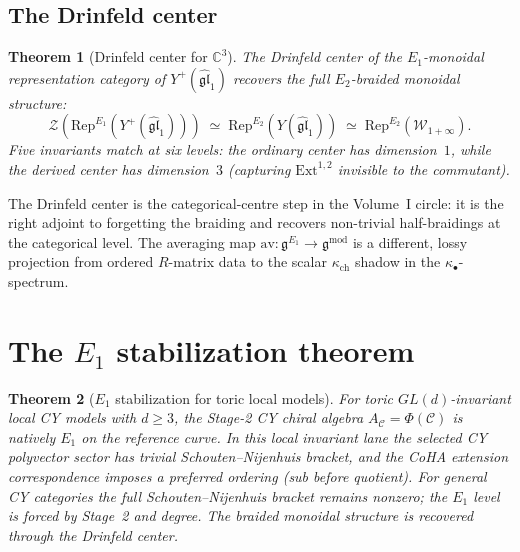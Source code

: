 \documentclass[11pt]{article}
\theoremstyle{plain}
\newtheorem{theorem}{Theorem}[section]
\theoremstyle{definition}
\theoremstyle{remark}
\newcommand{\fg}{\mathfrak{g}}
\newcommand{\fgl}{\mathfrak{gl}}
\newcommand{\cC}{\mathcal{C}}
\newcommand{\cW}{\mathcal{W}}
\newcommand{\cZ}{\mathcal{Z}}
\newcommand{\bC}{\mathbb{C}}
\newcommand{\Eone}{E_1}
\newcommand{\Etwo}{E_2}
\newcommand{\Rep}{\mathrm{Rep}}
\newcommand{\Ext}{\mathrm{Ext}}
\begin{document}
\subsection{The Drinfeld center}

\begin{theorem}[Drinfeld center for $\bC^3$]
\label{thm:v3-st-drinfeld-center}
The Drinfeld center of the $\Eone$-monoidal representation
category of $Y^+(\widehat{\fgl}_1)$ recovers the full
$\Etwo$-braided monoidal structure:
\[
 \cZ(\Rep^{\Eone}(Y^+(\widehat{\fgl}_1)))
 \;\simeq\;
 \Rep^{\Etwo}(Y(\widehat{\fgl}_1))
 \;\simeq\;
 \Rep^{\Etwo}(\cW_{1+\infty}).
\]
Five invariants match at six levels: the ordinary center has
dimension~$1$, while the derived center has dimension~$3$
(capturing $\Ext^{1,2}$ invisible to the commutant).
\end{theorem}

The Drinfeld center is the categorical-centre step in the Volume~I
circle: it is the right adjoint to forgetting the braiding and
recovers non-trivial half-braidings at the categorical level. The
averaging map
$\mathrm{av} \colon \fg^{\Eone} \to \fg^{\mathrm{mod}}$
is a different, lossy projection from ordered $R$-matrix data to the
scalar $\kappa_{\mathrm{ch}}$ shadow in the $\kappa_\bullet$-spectrum.



\section{The $\Eone$ stabilization theorem}
\label{sec:e1-stabilization}

\begin{theorem}[$\Eone$ stabilization for toric local models]
\label{thm:v3-st-e1-stabilization}
For toric $GL(d)$-invariant local CY models with $d \geq 3$, the
Stage-2 CY chiral algebra $A_\cC=\Phi(\cC)$ is natively $\Eone$ on
the reference curve.  In this local invariant lane the selected CY
polyvector sector has trivial Schouten--Nijenhuis bracket, and the
CoHA extension correspondence imposes a preferred ordering (sub
before quotient).  For general CY categories the full
Schouten--Nijenhuis bracket remains nonzero; the $\Eone$ level is
forced by Stage~2 and degree.  The braided monoidal structure is
recovered through the Drinfeld center.
\end{theorem}
\end{document}
